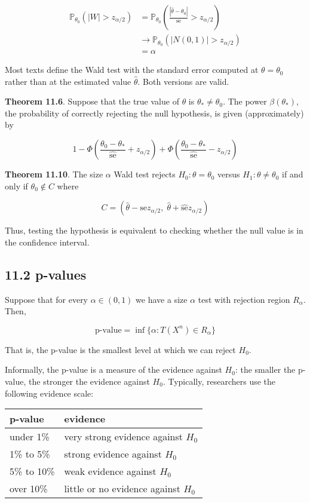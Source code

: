 \begin{align}
\mathbb{P}_{\theta_0}(|W| > z_{\alpha / 2}) &= \mathbb{P}_{\theta_0} \left(\frac{|\hat{\theta} - \theta_0|}{\text{se}} > z_{\alpha/2} \right) \\
& \rightarrow \mathbb{P}_{\theta_0}(| N(0, 1) | > z_{\alpha/2}) \\
& = \alpha
\end{align}

Most texts define the Wald test with the standard error computed at
\(\theta = \theta_0\) rather than at the estimated value
\(\hat{\theta}\). Both versions are valid.

\textbf{Theorem 11.6}. Suppose that the true value of \(\theta\) is
\(\theta_* \neq \theta_0\). The power \(\beta(\theta_*)\), the
probability of correctly rejecting the null hypothesis, is given
(approximately) by

\[ 1 - \Phi \left(\frac{\theta_0 - \theta_*}{\hat{\text{se}}} + z_{\alpha/2} \right) + \Phi \left(\frac{\theta_0 - \theta_*}{\hat{\text{se}}} - z_{\alpha/2} \right) \]

\textbf{Theorem 11.10}. The size \(\alpha\) Wald test rejects
\(H_0: \theta = \theta_0\) versus \(H_1: \theta \neq \theta_0\) if and
only if \(\theta_0 \notin C\) where

\[ C = \left(\hat{\theta} - \hat{\text{se}} z_{\alpha/2}, \; \hat{\theta} + \hat{\text{se}} z_{\alpha / 2} \right) \]

Thus, testing the hypothesis is equivalent to checking whether the null
value is in the confidence interval.

\subsection{11.2 p-values}\label{p-values}

Suppose that for every \(\alpha \in (0, 1)\) we have a size \(\alpha\)
test with rejection region \(R_\alpha\). Then,

\[ \text{p-value} = \inf \Big\{ \alpha : T(X^n) \in R_\alpha \Big\} \]

That is, the p-value is the smallest level at which we can reject
\(H_0\).

Informally, the p-value is a measure of the evidence against \(H_0\):
the smaller the p-value, the stronger the evidence against \(H_0\).
Typically, researchers use the following evidence scale:

\begin{longtable}[]{@{}ll@{}}
\toprule\noalign{}
p-value & evidence \\
\midrule\noalign{}
\endhead
\bottomrule\noalign{}
\endlastfoot
under 1\% & very strong evidence against \(H_0\) \\
1\% to 5\% & strong evidence against \(H_0\) \\
5\% to 10\% & weak evidence against \(H_0\) \\
over 10\% & little or no evidence against \(H_0\) \\
\end{longtable}

